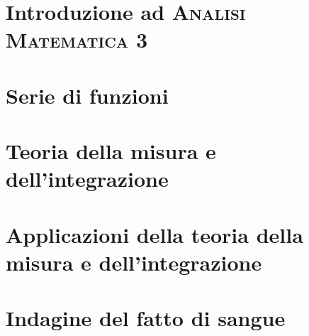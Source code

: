 \documentclass[a4paper, 11pt, twoside, openright, italian]{memoir}
\begin{document}
\frontmatter




\mainmatter

\part{Introduzione ad \textsc{Analisi Matematica 3}}

\part{Serie di funzioni}



\part{Teoria della misura e dell'integrazione}


\part{Applicazioni della teoria della misura e dell'integrazione}



\appendix
\part{Indagine del fatto di sangue}






\backmatter

\end{document}
